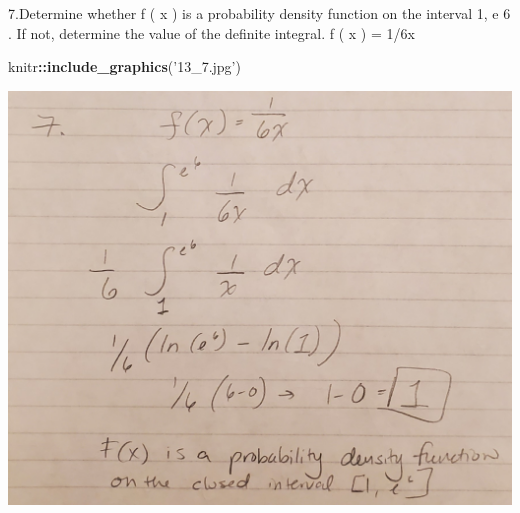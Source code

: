 \documentclass[
]{article}
\newenvironment{Shaded}{\begin{snugshade}}{\end{snugshade}}
\newcommand{\KeywordTok}[1]{\textcolor[rgb]{0.13,0.29,0.53}{\textbf{#1}}}
\newcommand{\NormalTok}[1]{#1}
\newcommand{\OperatorTok}[1]{\textcolor[rgb]{0.81,0.36,0.00}{\textbf{#1}}}
\newcommand{\StringTok}[1]{\textcolor[rgb]{0.31,0.60,0.02}{#1}}
\begin{document}
7.Determine whether f ( x ) is a probability density function on the
interval 1, e 6 . If not, determine the value of the definite integral.
f ( x ) = 1/6x

\begin{Shaded}
\begin{Highlighting}[]
\NormalTok{knitr}\OperatorTok{::}\KeywordTok{include_graphics}\NormalTok{(}\StringTok{'13_7.jpg'}\NormalTok{)}
\end{Highlighting}
\end{Shaded}

\includegraphics[width=24.19in]{13_7}
\end{document}
